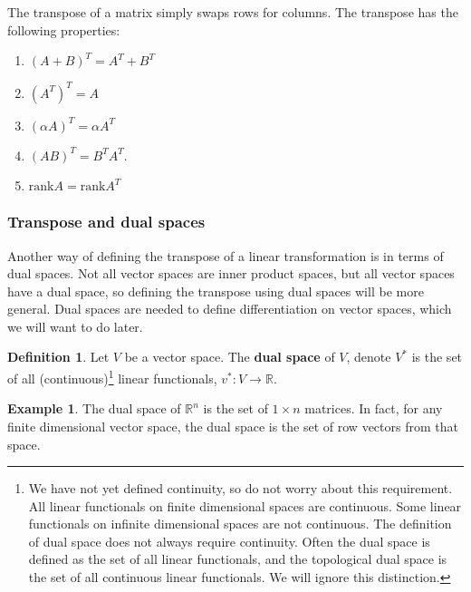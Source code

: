 \documentclass[12pt,reqno]{amsart}
\def\R{\mathbb{R}}
\newcommand{\rank}{\mathrm{rank}}
\theoremstyle{definition}
\newtheorem{definition}{Definition}[section]
\newtheorem{example}{Example}[section]
\begin{document}
The transpose of a matrix simply swaps rows for columns. The transpose
has the following properties:
\begin{enumerate}
\item $(A+B)^T = A^T + B^T$
\item $(A^T)^T = A$
\item $(\alpha A)^T = \alpha A^T$
\item $(AB)^T = B^T A^T$.
\item $\rank A = \rank A^T$
\end{enumerate}

\subsubsection{Transpose and dual spaces}

Another way of defining the transpose of a linear transformation is in
terms of dual spaces. Not all vector spaces are inner product spaces,
but all vector spaces have a dual space, so defining the transpose
using dual spaces will be more general. 
Dual spaces are needed to define differentiation
on vector spaces, which we will want to do later.
\begin{definition}
  Let $V$ be a vector space. The \textbf{dual space} of $V$, denote
  $V^\ast$ is the set of all (continuous)\footnote{We have not yet
    defined continuity, so do not worry about this requirement. All
    linear functionals on finite dimensional spaces are
    continuous. Some linear functionals on infinite dimensional spaces
    are not continuous. The definition of dual space does not always
    require continuity. Often the dual space is defined as the set of
    all linear functionals, and the topological dual space is the set
    of all continuous linear functionals. We will ignore this
    distinction.}  linear functionals, $v^\ast: V \to \R$.
\end{definition}

\begin{example}
  The dual space of $\R^n$ is the set of $1 \times n$ matrices. In
  fact, for any finite dimensional vector space, the dual space is the
  set of row vectors from that space. 
\end{example}
\end{document}
